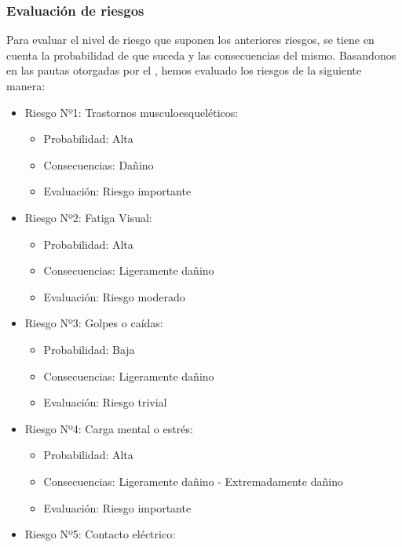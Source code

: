 \subsubsection{Evaluación de riesgos}
Para evaluar el nivel de riesgo que suponen los anteriores riesgos, se tiene en cuenta la probabilidad de que suceda
y las consecuencias del mismo. Basandonos en las pautas otorgadas por el \href{https://www.insst.es/documents/94886/96076/Evaluacion_riesgos.pdf/1371c8cb-7321-48c0-880b-611f6f380c1d?t=1526651610041}{\color{red}{INSST}},
hemos evaluado los riesgos de la siguiente manera: \\
\begin{itemize}
    \item Riesgo Nº1: Trastornos musculoesqueléticos: \begin{itemize}
              \item Probabilidad: Alta
              \item Consecuencias: Dañino
              \item Evaluación: Riesgo importante
          \end{itemize}
    \item Riesgo Nº2: Fatiga Visual: \begin{itemize}
              \item Probabilidad: Alta
              \item Consecuencias: Ligeramente dañino
              \item Evaluación: Riesgo moderado
          \end{itemize}
    \item Riesgo Nº3: Golpes o caídas: \begin{itemize}
              \item Probabilidad: Baja
              \item Consecuencias: Ligeramente dañino
              \item Evaluación: Riesgo trivial
          \end{itemize}
    \item Riesgo Nº4: Carga mental o estrés: \begin{itemize}
              \item Probabilidad: Alta
              \item Consecuencias: Ligeramente dañino - Extremadamente dañino
              \item Evaluación: Riesgo importante
          \end{itemize}
    \item Riesgo Nº5: Contacto eléctrico: \begin{itemize}

\end{itemize}
\end{itemize}
